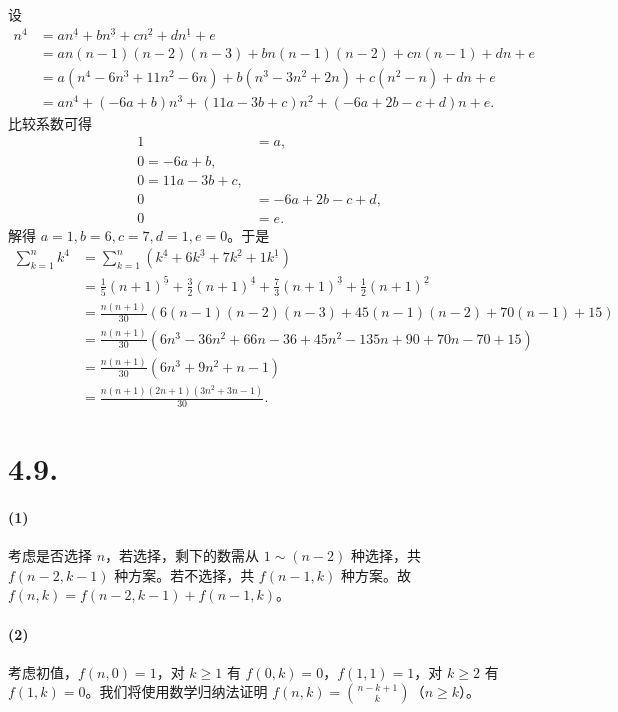 \documentclass{article}
\begin{document}
设
\begin{align}
    n^4&=an^{\underline{4}}+bn^{\underline{3}}+cn^{\underline{2}}+dn^{\underline{1}}+e \\
    &=an(n-1)(n-2)(n-3)+bn(n-1)(n-2)+cn(n-1)+dn+e \\
    &=a(n^4-6n^3+11n^2-6n)+b(n^3-3n^2+2n)+c(n^2-n)+dn+e \\
    &=an^4+(-6a+b)n^3+(11a-3b+c)n^2+(-6a+2b-c+d)n+e.
\end{align}
比较系数可得
\begin{align}
    1&=a, \\
    0=-6a+b, \\
    0=11a-3b+c, \\
    0&=-6a+2b-c+d, \\
    0&=e.
\end{align}
解得 $a=1,b=6,c=7,d=1,e=0$。于是
\begin{align}
    \sum_{k=1}^nk^4&=\sum_{k=1}^n\left(k^{\underline{4}}+6k^{\underline{3}}+7k^{\underline{2}}+1k^{\underline{1}} \right) \\
    &=\frac 15(n+1)^{\underline{5}}+\frac 32(n+1)^{\underline{4}}+\frac 73(n+1)^{\underline{3}}+\frac 12(n+1)^{\underline{2}} \\
    &=\frac{n(n+1)}{30}\left(6(n-1)(n-2)(n-3)+45(n-1)(n-2)+70(n-1)+15\right) \\
    &=\frac{n(n+1)}{30}(6n^3-36n^2+66n-36+45n^2-135n+90+70n-70+15) \\
    &=\frac{n(n+1)}{30}(6n^3+9n^2+n-1) \\
    &=\frac{n(n+1)(2n+1)(3n^2+3n-1)}{30}.
\end{align}

\section*{4.9.}
\paragraph{(1)} 考虑是否选择 $n$，若选择，剩下的数需从 $1\sim(n-2)$ 种选择，共 $f(n-2,k-1)$ 种方案。若不选择，共 $f(n-1,k)$ 种方案。故 $f(n,k)=f(n-2,k-1)+f(n-1,k)$。

\paragraph{(2)}
考虑初值，$f(n,0)=1$，对 $k\ge 1 $ 有 $f(0,k)=0$，$f(1,1)=1$，对 $k\ge 2$ 有 $f(1,k)=0$。我们将使用数学归纳法证明 $f(n,k)=\binom{n-k+1}{k}$（$n\ge k$）。
\end{document}
